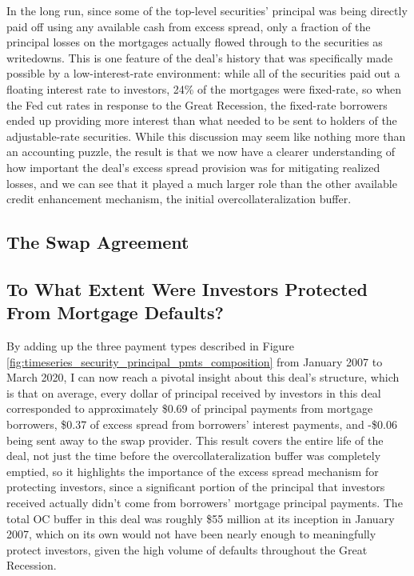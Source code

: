 \documentclass[12pt]{article}
\begin{document}
In the long run, since some of the top-level securities’ principal was being directly paid off using any available cash from excess spread, only a fraction of the principal losses on the mortgages actually flowed through to the securities as writedowns. This is one feature of the deal’s history that was specifically made possible by a low-interest-rate environment: while all of the securities paid out a floating interest rate to investors, 24\% of the mortgages were fixed-rate, so when the Fed cut rates in response to the Great Recession, the fixed-rate borrowers ended up providing more interest than what needed to be sent to holders of the adjustable-rate securities. While this discussion may seem like nothing more than an accounting puzzle, the result is that we now have a clearer understanding of how important the deal’s excess spread provision was for mitigating realized losses, and we can see that it played a much larger role than the other available credit enhancement mechanism, the initial overcollateralization buffer.

\subsection*{The Swap Agreement}

\subsection*{To What Extent Were Investors Protected From Mortgage Defaults?}

By adding up the three payment types described in Figure \ref{fig:timeseries_security_principal_pmts_composition} from January 2007 to March 2020, I can now reach a pivotal insight about this deal’s structure, which is that on average, every dollar of principal received by investors in this deal corresponded to approximately \$0.69 of principal payments from mortgage borrowers, \$0.37 of excess spread from borrowers’ interest payments, and -\$0.06 being sent away to the swap provider. This result covers the entire life of the deal, not just the time before the overcollateralization buffer was completely emptied, so it highlights the importance of the excess spread mechanism for protecting investors, since a significant portion of the principal that investors received actually didn’t come from borrowers’ mortgage principal payments. The total OC buffer in this deal was roughly \$55 million at its inception in January 2007, which on its own would not have been nearly enough to meaningfully protect investors, given the high volume of defaults throughout the Great Recession.
\end{document}
